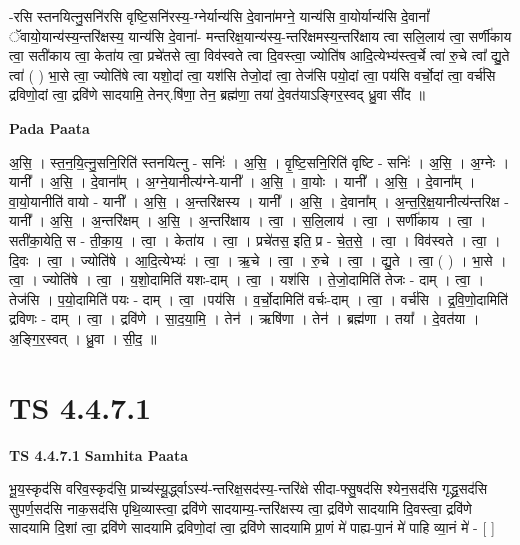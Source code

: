 \documentclass[17pt]{extarticle}
\begin{document}
-रसि स्तनयित्नु॒सनि॑रसि वृष्टि॒सनि॑रस्य॒-ग्नेर्यान्य॑सि दे॒वाना॑मग्ने॒ यान्य॑सि वा॒योर्यान्य॑सि दे॒वानां᳚ ॅवायो॒यान्य॑स्य॒न्तरि॑क्षस्य॒ यान्य॑सि दे॒वाना॑- मन्तरिक्ष॒यान्य॑स्य॒-न्तरि॑क्षमस्य॒न्तरि॑क्षाय त्वा सलि॒लाय॑ त्वा॒ सर्णी॑काय त्वा॒ सती॑काय त्वा॒ केता॑य त्वा॒ प्रचे॑तसे त्वा॒ विव॑स्वते त्वा दि॒वस्त्वा॒ ज्योति॑ष आदि॒त्येभ्य॑स्त्व॒र्चे त्वा॑ रु॒चे त्वा᳚ द्यु॒ते त्वा॑ ( ) भा॒से त्वा॒ ज्योति॑षे त्वा यशो॒दां त्वा॒ यश॑सि तेजो॒दां त्वा॒ तेज॑सि पयो॒दां त्वा॒ पय॑सि वर्चो॒दां त्वा॒ वर्च॑सि द्रविणो॒दां त्वा॒ द्रवि॑णे सादयामि॒ तेनर्.षि॑णा॒ तेन॒ ब्रह्म॑णा॒ तया॑ दे॒वत॑याऽङ्गिर॒स्वद् ध्रु॒वा सी॑द ॥ \newline

\textbf{Pada Paata} \newline

अ॒सि॒ । स्त॒न॒यि॒त्नु॒सनि॒रिति॑ स्तनयित्नु - सनिः॑ । अ॒सि॒ । वृ॒ष्टि॒सनि॒रिति॑ वृष्टि - सनिः॑ । अ॒सि॒ । अ॒ग्नेः । यानी᳚ । अ॒सि॒ । दे॒वाना᳚म् । अ॒ग्ने॒यानीत्य॑ग्ने-यानी᳚ । अ॒सि॒ । वा॒योः । यानी᳚ । अ॒सि॒ । दे॒वाना᳚म् । वा॒यो॒यानीति॑ वायो - यानी᳚ । अ॒सि॒ । अ॒न्तरि॑क्षस्य । यानी᳚ । अ॒सि॒ । दे॒वाना᳚म् । अ॒न्त॒रि॒क्ष॒यानीत्य॑न्तरिक्ष - यानी᳚ । अ॒सि॒ । अ॒न्तरि॑क्षम् । अ॒सि॒ । अ॒न्तरि॑क्षाय । त्वा॒ । स॒लि॒लाय॑ । त्वा॒ । सर्णी॑काय । त्वा॒ । सती॑का॒येति॒ स - ती॒का॒य॒ । त्वा॒ । केता॑य । त्वा॒ । प्रचे॑तस॒ इति॒ प्र - चे॒त॒से॒ । त्वा॒ । विव॑स्वते । त्वा॒ । दि॒वः । त्वा॒ । ज्योति॑षे । आ॒दि॒त्येभ्यः॑ । त्वा॒ । ऋ॒चे । त्वा॒ । रु॒चे । त्वा॒ । द्यु॒ते । त्वा॒ ( ) । भा॒से । त्वा॒ । ज्योति॑षे । त्वा॒ । य॒शो॒दामिति॑ यशः-दाम् । त्वा॒ । यश॑सि । ते॒जो॒दामिति॑ तेजः - दाम् । त्वा॒ । तेज॑सि । प॒यो॒दामिति॑ पयः - दाम् । त्वा॒ ।पय॑सि । व॒र्चो॒दामिति॑ वर्चः-दाम् । त्वा॒ । वर्च॑सि । द्र॒वि॒णो॒दामिति॑ द्रविणः - दाम् । त्वा॒ । द्रवि॑णे । सा॒द॒या॒मि॒ । तेन॑ । ऋषि॑णा । तेन॑ । ब्रह्म॑णा । तया᳚ । दे॒वत॑या । अ॒ङ्गि॒र॒स्वत् । ध्रु॒वा । सी॒द॒ ॥  \newline





\section{ TS 4.4.7.1 }

\textbf{TS 4.4.7.1 } \newline
\textbf{Samhita Paata} \newline

भू॒य॒स्कृद॑सि वरिव॒स्कृद॑सि॒ प्राच्य॑स्यू॒र्द्ध्वाऽस्य॑-न्तरिक्ष॒सद॑स्य॒-न्तरि॑क्षे सीदा-फ्सु॒षद॑सि श्येन॒सद॑सि गृद्ध्र॒सद॑सि सुपर्ण॒सद॑सि नाक॒सद॑सि पृथि॒व्यास्त्वा॒ द्रवि॑णे सादयाम्य॒-न्तरि॑क्षस्य त्वा॒ द्रवि॑णे सादयामि दि॒वस्त्वा॒ द्रवि॑णे सादयामि दि॒शां त्वा॒ द्रवि॑णे सादयामि द्रविणो॒दां त्वा॒ द्रवि॑णे सादयामि प्रा॒णं मे॑ पाह्य-पा॒नं मे॑ पाहि व्या॒नं मे॑ - [  ] \newline
\end{document}
